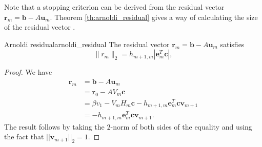 Note that a stopping criterion can be derived from the residual vector $\mathbf{r}_m = \mathbf{b} - A\mathbf{u}_m$. Theorem \ref{th:arnoldi_residual} gives a way of calculating the size of the residual vector \cite[Proposition 6.7]{iter_method_saad}.
\begin{APPfancyth}{Arnoldi residual}{arnoldi_residual}
  The residual vector $\mathbf{r}_m = \mathbf{b} - A\mathbf{u}_m$ satisfies
  \begin{equation}
    \|r_m\|_2 = h_{m+1,m}|\mathbf{e}^T_m \mathbf{c}|,
  \end{equation}
\end{APPfancyth}
\begin{proof}
  We have
  \begin{align*}
    \mathbf{r}_m & = \mathbf{b} - A\mathbf{u}_m                                                   \\
                  & = \mathbf{r}_0 - AV_m \mathbf{c}                                               \\
                  & = \beta v_1 - V_m H_m \mathbf{c} - h_{m+1,m} \mathbf{e}_m^T \mathbf{c} \mathbf{v}_{m+1} \\
                  & = - h_{m+1,m} \mathbf{e}_m^T \mathbf{c} \mathbf{v}_{m+1}.
  \end{align*}
  The result follows by taking the $2$-norm of both sides of the equality and using the fact that $||\mathbf{v}_{m+1}||_2 = 1$.
\end{proof}

